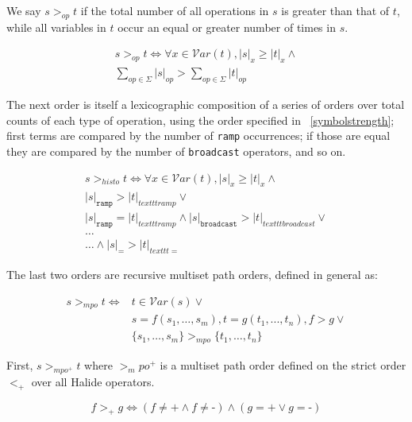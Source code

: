 \documentclass[sigplan,10pt,review,anonymous]{acmart}\settopmatter{printfolios=true,printccs=false,printacmref=false}
\begin{document}
We say $s >_{op} t$ if the total number of all operations in $s$ is greater than that of $t$, while all variables in $t$ occur an equal or greater number of times in $s$.

\begin{equation}
\begin{split}
s >_{op} t \iff \forall x \in \mathcal{V}ar(t), |s|_x \geq |t|_x \wedge \\
\sum_{op \in \Sigma} |s|_{op} > \sum_{op \in \Sigma} |t|_{op}
\end{split}
\end{equation}

The next order is itself a lexicographic composition of a series of orders over total counts of each type of operation, using the order specified in ~\ref{symbolstrength}; first terms are compared by the number of \texttt{ramp} occurrences; if those are equal they are compared by the number of \texttt{broadcast} operators, and so on. 

\begin{equation}
\begin{split}
s >_{histo} t \iff \forall x \in \mathcal{V}ar(t), |s|_x \geq |t|_x \wedge \\
|s|_{\texttt{ramp}} > |t|_{texttt{ramp}} \vee \\
|s|_{\texttt{ramp}} = |t|_{texttt{ramp}} \wedge |s|_{\texttt{broadcast}} > |t|_{texttt{broadcast}} \vee \\
\dots \\
\dots \wedge |s|_{\texttt{=}} > |t|_{texttt{=}} 
\end{split}
\end{equation}

The last two orders are recursive multiset path orders, defined in general as:

\begin{equation}
\begin{split}
s >_{mpo} t \iff & t \in \mathcal{V}ar(s) \vee \\
              &  s = f(s_1,\dots,s_m), t = g(t_1,...,t_n), f > g \vee \\
               & \{s_1, \dots, s_m\} >_{mpo} \{t_1,\dots,t_n\}
\end{split}
\end{equation}

First, $s >_{mpo^+} t$ where $>_mpo^+$ is a multiset path order defined on the strict order $<_+$ over all Halide operators.

\begin{equation}
f >_+ g \iff (f \neq \texttt{+} \wedge f \neq \texttt{-}) \wedge (g = \texttt{+} \vee g = \texttt{-})
\end{equation}
\end{document}
